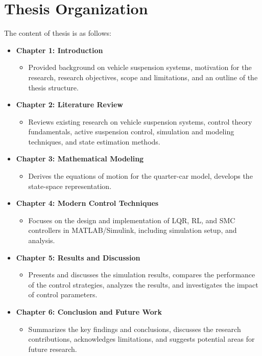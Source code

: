 \section{Thesis Organization}
The content of thesis is as follows:
\begin{itemize}
	\item \textbf{Chapter 1: Introduction}
	\begin{itemize}
		\item Provided background on vehicle suspension systems, motivation for the research, research objectives, scope and limitations, and an outline of the thesis structure. 
	\end{itemize}
	\item \textbf{Chapter 2: Literature Review}
	\begin{itemize}
		\item Reviews existing research on vehicle suspension systems, control theory fundamentals, active suspension control, simulation and modeling techniques, and state estimation methods.
	\end{itemize}
	\item \textbf{Chapter 3: Mathematical Modeling}
	\begin{itemize}
		\item Derives the equations of motion for the quarter-car model, develops the state-space representation.
	\end{itemize}
	\item \textbf{Chapter 4: Modern Control Techniques}
	\begin{itemize}
		\item Focuses on the design and implementation of LQR, RL, and SMC controllers in MATLAB/Simulink, including simulation setup, and analysis.
	\end{itemize}
	\item \textbf{Chapter 5: Results and Discussion}
	\begin{itemize}
		\item Presents and discusses the simulation results, compares the performance of the control strategies, analyzes the results, and investigates the impact of control parameters.
	\end{itemize}
	\item \textbf{Chapter 6: Conclusion and Future Work}
	\begin{itemize}
		\item Summarizes the key findings and conclusions, discusses the research contributions, acknowledges limitations, and suggests potential areas for future research.
	\end{itemize}
\end{itemize}
